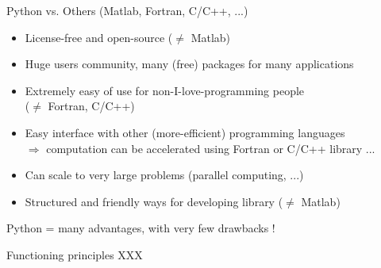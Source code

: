 \documentclass[11pt,unknownkeysallowed,usenames,dvipsnames]{beamer}
\begin{document}
	\begin{frame}{Python vs. Others (Matlab, Fortran, C/C++, ...)}
        \begin{itemize}
            \item License-free and open-source ($\neq$ Matlab)
            \item Huge users community, many (free) packages for many applications
            \item Extremely easy of use for non-I-love-programming people \\ ($\neq$ Fortran, C/C++)
            \item Easy interface with other (more-efficient) programming languages \\
            $\Rightarrow$ computation can be accelerated using Fortran or C/C++
            library ... 
            \item Can scale to very large problems (parallel computing, ...)
            \item Structured and friendly ways for developing library ($\neq$ Matlab)
        \end{itemize}
	
		\vspace{10pt}
	
		\begin{center}
            Python = many advantages, with very few drawbacks !
        \end{center}
	\end{frame}
    
	\begin{frame}{Functioning principles}
        XXX
    \end{frame}
\end{document}
